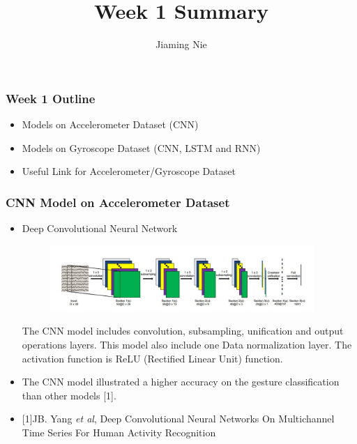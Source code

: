 \documentclass{beamer} %
\author{Jiaming Nie}
\title{Week 1 Summary}
\begin{document}




\begin{frame}
\frametitle{Week 1 Outline}

\begin{itemize}
\item Models on Accelerometer Dataset (CNN)
\item Models on Gyroscope Dataset (CNN, LSTM and RNN)
\item Useful Link for Accelerometer/Gyroscope Dataset 
\end{itemize}



\end{frame}

\begin{frame}
\frametitle{CNN Model on Accelerometer Dataset}

\begin{itemize}
\item Deep Convolutional Neural Network

 \begin{figure}[htbp] 
	
	\begin{center}
		\includegraphics[width=10cm]{./image/a1} 
		\label{fig:sensor}		
	\end{center}
 \end{figure}

The CNN model includes convolution, subsampling, unification and output operations layers. This model also include one Data normalization layer. The activation function is ReLU (Rectified Linear Unit) function. 

\item The CNN model illustrated a higher accuracy on the gesture classification than other models [1].

\item \tiny [1]{JB. Yang \textit{et al}, Deep Convolutional Neural Networks On Multichannel Time Series For Human Activity Recognition}
\end{itemize}

\end{frame}
\end{document}
